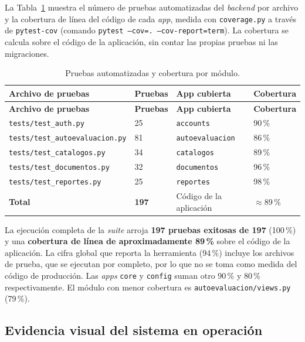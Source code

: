 La Tabla~\ref{tab:metricasTests} muestra el número de pruebas automatizadas del \emph{backend} por archivo y la cobertura de línea del código de cada \emph{app}, medida con \texttt{coverage.py} a través de \texttt{pytest-cov} (comando \texttt{pytest --cov=. --cov-report=term}). La cobertura se calcula sobre el código de la aplicación, sin contar las propias pruebas ni las migraciones.

\begin{longtable}{p{} p{} p{} p{}}
    \caption{Pruebas automatizadas y cobertura por módulo.}
    \label{tab:metricasTests}\\
    \toprule
    \textbf{Archivo de pruebas} & \textbf{Pruebas} & \textbf{App cubierta} & \textbf{Cobertura} \\
    \midrule
    \endfirsthead

    \toprule
    \textbf{Archivo de pruebas} & \textbf{Pruebas} & \textbf{App cubierta} & \textbf{Cobertura} \\
    \midrule
    \endhead

    \texttt{tests/test\_auth.py} & 25 & \texttt{accounts} & 90\,\% \\
    \midrule
    \texttt{tests/test\_autoevaluacion.py} & 81 & \texttt{autoevaluacion} & 86\,\% \\
    \midrule
    \texttt{tests/test\_catalogos.py} & 34 & \texttt{catalogos} & 89\,\% \\
    \midrule
    \texttt{tests/test\_documentos.py} & 32 & \texttt{documentos} & 96\,\% \\
    \midrule
    \texttt{tests/test\_reportes.py} & 25 & \texttt{reportes} & 98\,\% \\
    \midrule
    \textbf{Total} & \textbf{197} & Código de la aplicación & $\approx$89\,\% \\
    \bottomrule
\end{longtable}

La ejecución completa de la \emph{suite} arroja \textbf{197 pruebas exitosas de 197} (100\,\%) y una \textbf{cobertura de línea de aproximadamente 89\,\%} sobre el código de la aplicación. La cifra global que reporta la herramienta (94\,\%) incluye los archivos de prueba, que se ejecutan por completo, por lo que no se toma como medida del código de producción. Las \emph{apps} \texttt{core} y \texttt{config} suman otro 90\,\% y 80\,\% respectivamente. El módulo con menor cobertura es \texttt{autoevaluacion/views.py} (79\,\%).

\subsection{Evidencia visual del sistema en operación}

